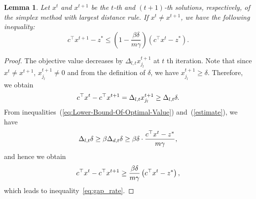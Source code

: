 \documentclass[12pt]{article}
\newtheorem{lemma}{Lemma}[section]
\begin{document}
\begin{lemma} \label{lm:gap_rate}
Let $x^t$ and $x^{t+1}$ be the $t$-th and $(t+1)$-th solutions, respectively, of the simplex method with largest distance rule.
If $x^t\not=x^{t+1}$, we have the following inequality:
\begin{equation} \label{eq:gap_rate}
  c^{\top} x^{t+1} - z^* \le \left( 1 - \frac{\beta \delta}{m \gamma} \right) \left( c^{\top} x^{t} - z^* \right).
\end{equation}
\end{lemma}
%
\begin{proof}
The objective value decreases by $\Delta_{l,t} x_{j_{l}}^{t+1}$ at $t$ th iteration.
Note that since $x^t\not=x^{t+1}$, $x_{j_{l}}^{t+1}\not=0$ and from the definition of $\delta$, we have $x_{j_{l}}^{t+1}\ge\delta$.
Therefore, we obtain 
\begin{equation} \notag
  c^{\top} x^{t} - c^{\top} x^{t+1} = \Delta_{l,t} x_{j_{l}}^{t+1} \ge \Delta_{l,t} \delta.
\end{equation}
From inequalities~(\ref{eq:Lower-Bound-Of-Optimal-Value}) and~(\ref{estimate}), we have
\begin{equation} \notag
  \Delta_{l,t} \delta \ge \beta\Delta_{d,t} \delta \ge \beta \delta \cdot \frac{c^{\top} x^t - z^*}{m\gamma},
\end{equation}
and hence we obtain
\begin{equation} \notag
  c^{\top} x^{t} - c^{\top} x^{t+1} \ge \frac{\beta\delta}{m\gamma} \left(c^{\top} x^t - z^* \right),
\end{equation}
which leads to inequality~\eqref{eq:gap_rate}. 
\end{proof}
%
\end{document}
